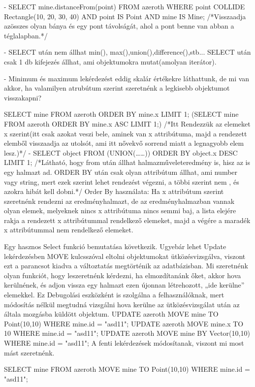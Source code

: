 - SELECT mine.distanceFrom(point)
FROM azeroth
WHERE
point COLLIDE Rectangle(10, 20, 30, 40) AND
point IS Point AND
mine IS Mine;
/*Visszaadja azösszes olyan bánya és egy pont távolságát, ahol a pont benne van abban a téglalapban.*/

- SELECT után nem állhat min(), max(),union(),difference(),stb...
SELECT után csak 1 db kifejezés állhat, ami objektumokra mutat(amolyan iterátor).

- Minimum és maximum lekérdezést eddig skalár értékekre láthattunk, de mi van akkor, ha valamilyen atrubútum szerint szeretnénk a legkisebb objektumot visszakapni?

SELECT mine FROM azeroth ORDER BY mine.x LIMIT 1;
(SELECT mine FROM azeroth ORDER BY mine.x ASC LIMIT 1;)
/*Itt Rendezzük az elemeket x szerint(itt csak azokat veszi bele, aminek van x attribútuma, majd a rendezett elemből visszaadja az utolsót, ami itt nővekvő sorrend miatt a legnagyobb elem lesz.)*/
- SELECT object FROM (UNION(……)) ORDER BY object.x DESC LIMIT 1;
/*Látható, hogy from után állhat halmazműveleteredmény is, hisz az is egy halmazt ad. ORDER BY után csak olyan attribútum állhat, ami number vagy string, mert ezek szerint lehet rendezést végezni, a többi szerint nem , és azokra hibát kell dobni.*/
Order By használata: Ha x attribútum szerint szeretnénk rendezni az eredményhalmazt, de az eredményhalmazban vannak olyan elemek, melyeknek nincs x attribútuma nincs semmi baj, a lista elejére rakja a rendezett x attribútummal rendelkező elemeket, majd a végére a maradék x attribútummal nem rendelkező elemeket. 

Egy hasznos Select funkció bemutatása következik. Ugyebár lehet Update lekérdezésben MOVE kulcsszóval eltolni objektumokat ütközésvizsgálva, viszont ezt a parancsot kiadva a változtatás megtörténik az adatbázisban.
Mi szeretnénk olyan funkciót, hogy leszeretnénk kérdezni, ha elmozdítanánk őket, akkor hova kerülnének, és adjon vissza egy halmazt ezen újonnan létrehozott, „ide kerülne” elemekkel. Ez Debugolási eszközként is szolgálna a felhasználóknak, mert módosítás nélkül megtudná vizsgálni hova kerülne az ütközésvizsgálat után az általa mozgásba küldött objektum.
UPDATE azeroth MOVE  mine TO  Point(10,10) WHERE mine.id = "asd11"; 
UPDATE azeroth MOVE  mine.x TO 10 WHERE mine.id = "asd11"; 
UPDATE azeroth MOVE  mine BY  Vector(10,10) WHERE mine.id = "asd11"; 
A fenti lekérdezések módosítanak, viszont mi most mást szeretnénk.

SELECT mine FROM azeroth MOVE  mine TO  Point(10,10) WHERE mine.id = "asd11"; 

